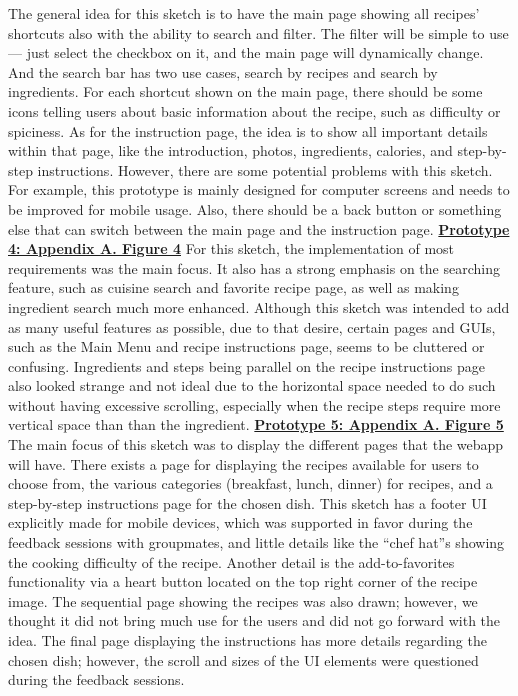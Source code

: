 \documentclass[11pt,english]{article}
\begin{document}
The general idea for this sketch is to have the main page showing all recipes’ shortcuts also with the ability to search and filter. The filter will be simple to use — just select the checkbox on it, and the main page will dynamically change. And the search bar has two use cases, search by recipes and search by ingredients. For each shortcut shown on the main page, there should be some icons telling users about basic information about the recipe, such as difficulty or spiciness. As for the instruction page, the idea is to show all important details within that page, like the introduction, photos, ingredients, calories, and step-by-step instructions. However, there are some potential problems with this sketch. For example, this prototype is mainly designed for computer screens and needs to be improved for mobile usage. Also, there should be a back button or something else that can switch between the main page and the instruction page.
\newline
\newline
\textbf{\underline{Prototype 4: Appendix A. Figure 4}}
\newline
\newline
For this sketch, the implementation of most requirements was the main focus. It also has a strong emphasis on the searching feature, such as cuisine search and favorite recipe page, as well as making ingredient search much more enhanced. Although this sketch was intended to add as many useful features as possible, due to that desire, certain pages and GUIs, such as the Main Menu and recipe instructions page, seems to be cluttered or confusing. Ingredients and steps being parallel on the recipe instructions page also looked strange and not ideal due to the horizontal space needed to do such without having excessive scrolling, especially when the recipe steps require more vertical space than than the ingredient.
\newline
\newline
\textbf{\underline{Prototype 5: Appendix A. Figure 5}}
\newline
\newline
The main focus of this sketch was to display the different pages that the webapp will have. There exists a page for displaying the recipes available for users to choose from, the various categories (breakfast, lunch, dinner) for recipes, and a step-by-step instructions page for the chosen dish. This sketch has a footer UI explicitly made for mobile devices, which was supported in favor during the feedback sessions with groupmates, and little details like the “chef hat”s showing the cooking difficulty of the recipe. Another detail is the add-to-favorites functionality via a heart button located on the top right corner of the recipe image. The sequential page showing the recipes was also drawn; however, we thought it did not bring much use for the users and did not go forward with the idea. The final page displaying the instructions has more details regarding the chosen dish; however, the scroll and sizes of the UI elements were questioned during the feedback sessions.
\newpage
\end{document}
